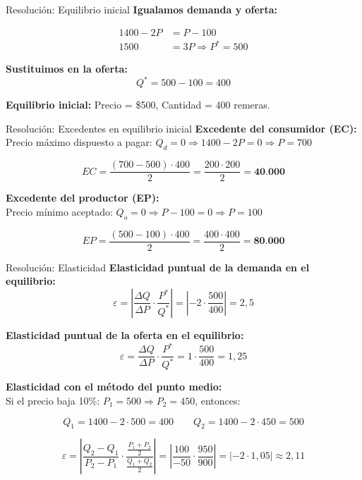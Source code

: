 \documentclass{beamer}
\begin{document}
\begin{frame}{Resolución: Equilibrio inicial}
\textbf{Igualamos demanda y oferta:}

\begin{align*}
1400 - 2P &= P -100 \\
1500 &= 3P \Rightarrow P^* = 500
\end{align*}

\textbf{Sustituimos en la oferta:}
\[
Q^* = 500 - 100 = 400
\]

\textbf{Equilibrio inicial:} Precio = \$500, Cantidad = 400 remeras.
\end{frame}

\begin{frame}{Resolución: Excedentes en equilibrio inicial}
\textbf{Excedente del consumidor (EC):} \\
Precio máximo dispuesto a pagar: $Q_d = 0 \Rightarrow 1400 - 2P = 0 \Rightarrow P = 700$

\[
EC = \frac{(700 - 500) \cdot 400}{2}  = \frac{200\cdot 200}{2}  = \textbf{40.000}
\]

\textbf{Excedente del productor (EP):} \\
Precio mínimo aceptado: $Q_o = 0 \Rightarrow P-100 = 0 \Rightarrow P = 100$

\[
EP = \frac{(500-100) \cdot400 }{2} = \frac{400 \cdot 400}{2} = \textbf{80.000}
\]
\end{frame}
\begin{frame}{Resolución: Elasticidad}
\textbf{Elasticidad puntual de la demanda en el equilibrio:}
\[
\varepsilon = \left| \frac{\Delta Q}{\Delta P} \cdot \frac{P^*}{Q^*} \right| = \left| -2 \cdot \frac{500}{400} \right| = 2,5
\]

\textbf{Elasticidad puntual de la oferta en el equilibrio:}
\[
\varepsilon = \frac{\Delta Q}{\Delta P} \cdot \frac{P^*}{Q^*}  = 1 \cdot \frac{500}{400}  = 1,25
\]

\textbf{Elasticidad con el método del punto medio:} \\
Si el precio baja 10\%: $P_1 = 500 \Rightarrow P_2 = 450$, entonces:

\[
Q_1 = 1400 - 2 \cdot 500 = 400 \qquad Q_2 = 1400 - 2 \cdot 450 = 500
\]

\[
\varepsilon = \left| \frac{Q_2 - Q_1}{P_2 - P_1} \cdot \frac{\frac{P_1 + P_2}{2}}{\frac{Q_1 + Q_2}{2}} \right| = \left| \frac{100}{-50} \cdot \frac{950}{900} \right| = \left| -2 \cdot 1,05 \right| \approx 2,11
\]
\end{frame}
\end{document}
